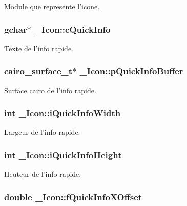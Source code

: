 Module que represente l'icone. 

\subsubsection{\setlength{\rightskip}{0pt plus 5cm}gchar$\ast$ {\bf \_\-Icon::cQuickInfo}}\label{struct__Icon_a9d8cbea9ad2bdb074a968c0d6759246}


Texte de l'info rapide. 

\subsubsection{\setlength{\rightskip}{0pt plus 5cm}cairo\_\-surface\_\-t$\ast$ {\bf \_\-Icon::pQuickInfoBuffer}}\label{struct__Icon_d76fc0ce7debba080e598955f87f5ce4}


Surface cairo de l'info rapide. 

\subsubsection{\setlength{\rightskip}{0pt plus 5cm}int {\bf \_\-Icon::iQuickInfoWidth}}\label{struct__Icon_455e501ac7cbec2e9f7b88f8bb064438}


Largeur de l'info rapide. 

\subsubsection{\setlength{\rightskip}{0pt plus 5cm}int {\bf \_\-Icon::iQuickInfoHeight}}\label{struct__Icon_766df2d95a65730626349bdb5901962f}


Heuteur de l'info rapide. 

\subsubsection{\setlength{\rightskip}{0pt plus 5cm}double {\bf \_\-Icon::fQuickInfoXOffset}}\label{struct__Icon_aa5953181fa5eb4dc927396b1d3436cf}


